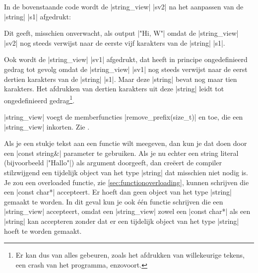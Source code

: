 \begin{cpplstShortInline}
In de bovenstaande code wordt de |string_view| |sv2| na het aanpassen van de |string| |s1| afgedrukt:

Dit geeft, misschien onverwacht, als output |"Hi, W"| omdat de |string_view| |sv2| nog steeds verwijst naar de eerste vijf karakters van de |string| |s1|.

Ook wordt de |string_view| |sv1| afgedrukt, dat heeft in principe ongedefinieerd gedrag tot gevolg omdat de |string_view| |sv1| nog steeds verwijst naar de eerst dertien karakters van de |string| |s1|.
Maar deze |string| bevat nog maar tien karakters. 
Het afdrukken van dertien karakters uit deze |string| leidt tot ongedefinieerd gedrag\footnote{%
	Er kan dus van alles gebeuren, zoals het afdrukken van willekeurige tekens, een crash van het programma, enzovoort.
}.

|string_view| voegt de memberfuncties |remove_prefix(size_t)| en  toe, die een |string_view| inkorten.
Zie .

Als je een stukje tekst aan een functie wilt meegeven, dan kun je dat doen door een |const string&| parameter te gebruiken. 
Als je nu echter een string literal (bijvoorbeeld |"Hallo"|) als argument doorgeeft, dan creëert de compiler stilzwijgend een tijdelijk object van het type |string| dat misschien niet nodig is.
Je zou een overloaded functie, zie \cref{sec:functionoverloading}, kunnen schrijven die een |const char*| accepteert.
Er hoeft dan geen object van het type |string| gemaakt te worden.
In dit geval kun je ook één functie schrijven die een |string_view| accepteert, omdat een |string_view| zowel een |const char*| als een |string| kan accepteren zonder dat er een tijdelijk object van het type |string| hoeft te worden gemaakt.



\end{cpplstShortInline}
